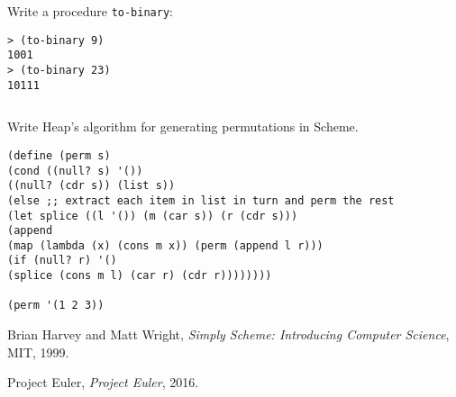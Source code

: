 \begin{questions}
\question
Write a procedure \texttt{to-binary}:
\begin{verbatim}
> (to-binary 9)
1001
> (to-binary 23)
10111
\end{verbatim}

\begin{solution}
  \begin{verbatim}

  \end{verbatim}
\end{solution}

\question
Write Heap's algorithm for generating permutations in Scheme.

\begin{solution}
  \begin{verbatim}
(define (perm s)
(cond ((null? s) '())
((null? (cdr s)) (list s))
(else ;; extract each item in list in turn and perm the rest
(let splice ((l '()) (m (car s)) (r (cdr s)))
(append
(map (lambda (x) (cons m x)) (perm (append l r)))
(if (null? r) '()
(splice (cons m l) (car r) (cdr r))))))))

(perm '(1 2 3))
  \end{verbatim}
\end{solution}

\end{questions}

\begin{thebibliography}{12}
  
  Brian Harvey and Matt Wright,
  \emph{Simply Scheme: Introducing Computer Science},
  MIT,
  1999.
  
  Project Euler,
  \emph{Project Euler},
  2016.

\end{thebibliography}
